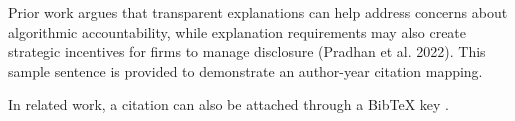 \documentclass{article}
\begin{document}
Prior work argues that transparent explanations can help address concerns about algorithmic accountability, while explanation requirements may also create strategic incentives for firms to manage disclosure (Pradhan et al. 2022). This sample sentence is provided to demonstrate an author-year citation mapping.

In related work, a citation can also be attached through a BibTeX key \citep{pradhan2022xai}.


\end{document}
